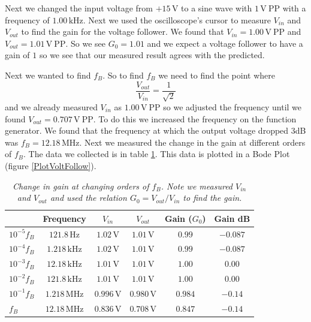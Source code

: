 \documentclass[11pt]{article}
\numberwithin{equation}{section}
\numberwithin{figure}{section}
\numberwithin{table}{section}
\newcommand{\unit}[1]{\ensuremath{\, \mathrm{#1}}}
\begin{document}
Next we changed the input voltage from $+15\unit{V}$ to a sine wave with $1\unit{V\ PP}$ with a frequency of $1.00\unit{kHz}$. Next we used the oscilloscope's cursor to measure $V_{in}$ and $V_{out}$ to find the gain for the voltage follower. We found that $V_{in} = 1.00\unit{V\ PP}$ and $V_{out} = 1.01\unit{V\ PP}$. So we see $G_0 = 1.01$ and we expect a voltage follower to have a gain of $1$ so we see that our measured result agrees with the predicted.

Next we wanted to find $f_B$. So to find $f_B$ we need to find the point where
$$\frac{V_{out}}{V_{in}} = \frac{1}{\sqrt{2}}$$
and we already measured $V_{in}$ as $1.00\unit{V\ PP}$ so we adjusted the frequency until we found $V_{out} = 0.707\unit{V\ PP}$. To do this we increased the frequency on the function generator. We found that the frequency at which the output voltage dropped $3$dB was $f_B = 12.18\unit{MHz}$. Next we measured the change in the gain at different orders of $f_B$. The data we collected is in table \ref{1partc}. This data is plotted in a Bode Plot (figure \ref{PlotVoltFollow}).

\begin{table}[h]
\centering
\begin{tabular}{lccccc}
		&Frequency		&$V_{in}$	&$V_{out}$		&Gain ($G_0$)	&Gain dB\\
\hline
$10^{-5}f_B$	&$121.8\unit{Hz}$	&$1.02\unit{V}$	&$1.01\unit{V}$		&$0.99$	&$-0.087$\\
$10^{-4}f_B$	&$1.218\unit{kHz}$	&$1.02\unit{V}$	&$1.01\unit{V}$		&$0.99$	&$-0.087$\\
$10^{-3}f_B$	&$12.18\unit{kHz}$	&$1.01\unit{V}$	&$1.01\unit{V}$		&$1.00$	&$0.00$\\
$10^{-2}f_B$	&$121.8\unit{kHz}$	&$1.01\unit{V}$	&$1.01\unit{V}$		&$1.00$	&$0.00$\\
$10^{-1}f_B$	&$1.218\unit{MHz}$	&$0.996\unit{V}$&$0.980\unit{V}$	&$0.984$	&$-0.14$\\
$f_B$		&$12.18\unit{MHz}$	&$0.836\unit{V}$&$0.708\unit{V}$	&$0.847$	&$-0.14$\\
\end{tabular}
\caption{\textit{Change in gain at changing orders of $f_B$. Note we measured $V_{in}$ and $V_{out}$ and used the relation $G_0 = V_{out}/V_{in}$ to find the gain.}}
\label{1partc}
\end{table}
\end{document}
